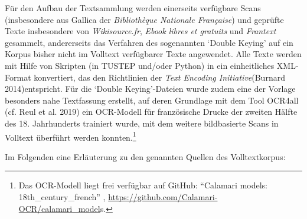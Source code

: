 \documentclass[
  12pt,
  letterpaper,
  DIV=11,
  numbers=noendperiod]{scrreprt}
\begin{document}
Für den Aufbau der Textsammlung werden einerseits verfügbare Scans
(insbesondere aus Gallica der \emph{Bibliothèque Nationale Française})
und geprüfte Texte insbesondere von \emph{Wikisource.fr}, \emph{Ebook
libres et gratuits} und \emph{Frantext} gesammelt, andererseits das
Verfahren des sogenannten `Double Keying' auf ein Korpus bisher nicht im
Volltext verfügbarer Texte angewendet. Alle Texte werden mit Hilfe von
Skripten (in TUSTEP und/oder Python) in ein einheitliches XML-Format
konvertiert, das den Richtlinien der \emph{Text Encoding
Initiative}(Burnard 2014)entspricht. Für die `Double Keying'-Dateien
wurde zudem eine der Vorlage besonders nahe Textfassung erstellt, auf
deren Grundlage mit dem Tool OCR4all (cf. Reul et al. 2019) ein
OCR-Modell für französische Drucke der zweiten Hälfte des 18.
Jahrhunderts trainiert wurde, mit dem weitere bildbasierte Scans in
Volltext überführt werden konnten.\footnote{Das OCR-Modell liegt frei
  verfügbar auf GitHub: ``Calamari models: 18th\_century\_french'' ,
  \href{https://github.com/Calamari-OCR/calamari_models}{https://github.com/Calamari-OCR/calamari\_model}s.}

Im Folgenden eine Erläuterung zu den genannten Quellen des
Volltextkorpus:
\end{document}
